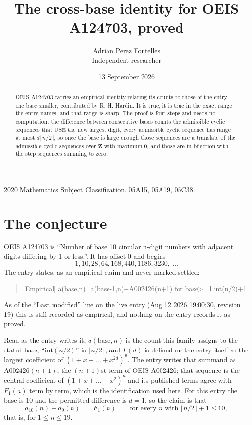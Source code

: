 \documentclass[11pt,a4paper]{article}
\title{The cross-base identity for OEIS A124703, proved}
\author{Adrian Perez Fontelles\\ \small Independent researcher}
\date{13 September 2026}
\theoremstyle{plain}
\theoremstyle{definition}
\begin{document}
\maketitle

\begin{abstract}
OEIS A124703 carries an empirical identity relating its counts to those of the entry one base
smaller, contributed by R. H. Hardin. It is true, it is true in the exact range the entry
names, and that range is sharp. The proof is four steps and needs no computation: the
difference between consecutive bases counts the admissible cyclic sequences that USE the new
largest digit, every admissible cyclic sequence has range at most $d\lfloor n/2\rfloor$, so
once the base is large enough those sequences are a translate of the admissible cyclic
sequences over $\mathbf{Z}$ with maximum $0$, and those are in bijection with the step
sequences summing to zero.
\end{abstract}

\noindent\small 2020 Mathematics Subject Classification. 05A15, 05A19, 05C38.\normalsize

\section{The conjecture}

OEIS A124703 is ``Number of base 10 circular n-digit numbers with adjacent digits differing by 1 or less.''. It has offset $0$ and begins
\[
1, 10, 28, 64, 168, 440, 1186, 3230,\ \dots
\]
The entry states, as an empirical claim and never marked settled:
\begin{quote}
[Empirical] a(base,n)=a(base-1,n)+A002426(n+1) for base>=1.int(n/2)+1
\end{quote}
As of the ``Last modified'' line on the live entry (Aug 12 2026 19:00:30, revision 19)
this is still recorded as empirical, and nothing on the entry records it as proved.

Read as the entry writes it, $a(\mathrm{base},n)$ is the count this family assigns to the
stated base, ``$\mathrm{int}(n/2)$'' is $\lfloor n/2\rfloor$, and $F(d)$ is defined on the
entry itself as the largest coefficient of $(1+x+\dots+x^{2d})^{n}$. The entry writes that summand as $\mathrm{A002426}(n+1)$, the $(n+1)$st term of OEIS A002426; that sequence is the central coefficient of $(1+x+\dots+x^{2})^{n}$ and its published terms agree with $F_{1}(n)$ term by term, which is the identification used here. For this entry
the base is $10$ and the permitted difference is $d=1$, so the claim is that
\[
a_{10}(n)-a_{9}(n)\;=\;F_{1}(n)
\qquad\text{for every } n \text{ with } \lfloor n/2\rfloor+1\le10,
\]
that is, for $1\le n\le19$.
\end{document}

